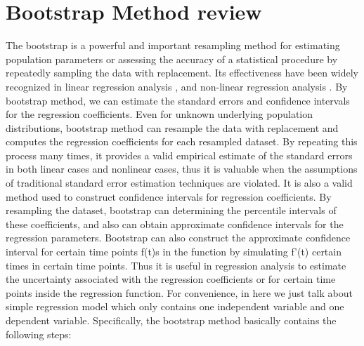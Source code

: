 \documentclass[12pt]{article}
\begin{document}
\section{Bootstrap Method review}
\label{Bootstrap Method for Constructing Confidence Intervals}

The bootstrap is a powerful and important resampling method for estimating population parameters or assessing the accuracy of a statistical procedure by repeatedly sampling the data with replacement. Its effectiveness have been widely recognized in linear regression analysis \cite{efron1979bootstrap}, and non-linear regression analysis \cite{davidson1999bootstrap}. By bootstrap method, we can estimate the standard errors and confidence intervals for the regression coefficients. Even for unknown underlying population distributions, bootstrap method can resample the data with replacement and computes the regression coefficients for each resampled dataset. \cite{hall2013simple}By repeating this process many times, it provides a valid empirical estimate of the standard errors in both linear cases \cite{efron1985bootstrap} and nonlinear cases\cite{wong2019bootstrap}, thus it is valuable when the assumptions of traditional standard error estimation techniques are violated. It is also a valid method used to construct confidence intervals for regression coefficients. \cite{efron1985bootstrap}By resampling the dataset, bootstrap can determining the percentile intervals of these coefficients, and also can obtain approximate confidence intervals for the regression parameters. \cite{cui2012evaluating} Bootstrap can also construct the approximate confidence interval for certain time points f(t)s in the function by simulating f'(t) certain times in certain time points. \cite{horowitz2018bootstrap} Thus it is useful in regression analysis to estimate the uncertainty associated with the regression coefficients or for certain time points inside the regression function. \cite{Efron2011-sn}For convenience, in here we just talk about simple regression model which only contains one independent variable and one dependent variable. Specifically, the bootstrap method basically contains the following steps:
\end{document}
